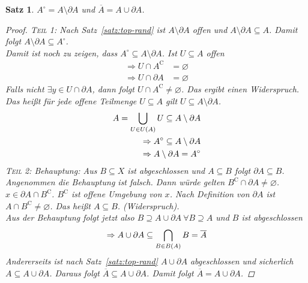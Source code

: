 \documentclass[11pt, twoside, a4paper]{article}
\theoremstyle{plain}
\newtheorem{satz}[blockelement]{Satz}
\numberwithin{equation}{subsection}
\newcommand{\of}[1]{\mathopen{}\mathclose{}\bgroup\left(#1\aftergroup\egroup\right)}
\newcommand{\impl}[0]{\Rightarrow{}}
\newcommand{\exclude}[0]{\setminus}
\renewcommand{\emptyset}{\varnothing}
\begin{document}
    \begin{satz} %
        $A^{\circ} = A \exclude \partial A$ und $\overline{A} = A \cup \partial A$.
        \begin{proof}
            \textsc{Teil 1}: Nach Satz~\ref{satz:top-rand} ist $A\exclude \partial A$ offen und $A \exclude \partial A \subseteq A$. Damit folgt $A \exclude \partial A \subseteq A^{\circ}$.\\
            Damit ist noch zu zeigen, dass $A^{\circ} \subseteq A \exclude \partial A$. Ist $U\subseteq A$ offen
            \begin{align*}
                \impl U\cap A^{\mathrm{C}} &= \emptyset \\
                \impl U \cap \partial A &= \emptyset
            \end{align*}
            Falls nicht $\exists y \in U \cap \partial A$, dann folgt $U\cap A^{\mathrm{C}} \neq \emptyset$. Das ergibt einen Widerspruch.\\
            Das heißt für jede offene Teilmenge $U\subseteq A$ gilt $U\subseteq A\exclude \partial A$.
            \begin{align*}
                A = \bigcup_{U\in U\of{A}} U \subseteq A \exclude \partial A\\
                \impl A^{\circ} \subseteq A \exclude \partial A\\
                \impl A \exclude \partial A = A^{\circ}
            \end{align*}
            \textsc{Teil 2}: Behauptung: Aus $B\subseteq X$ ist abgeschlossen und $A \subseteq B$ folgt $\partial A \subseteq B$. Angenommen die Behauptung ist falsch. Dann würde gelten $B^{\mathrm{C}} \cap \partial A \neq \emptyset$.\\
            $x\in \partial A \cap B^{\mathrm{C}}$. $B^{\mathrm{C}}$ ist offene Umgebung von $x$. Nach Definition von $\partial A$ ist $A\cap B^{\mathrm{C}}\neq \emptyset$. Das heißt $A \subseteq B$. (Widerspruch).\\
            Aus der Behauptung folgt jetzt also $B \supseteq A \cup \partial A~\forall B\supseteq A$ und $B$ ist abgeschlossen
            \begin{align*}
                \impl A \cup \partial A \subseteq \bigcap_{B\in B\of{A}} B = \overline{A}
            \end{align*}
            Andererseits ist nach Satz~\ref{satz:top-rand} $A \cup \partial A$ abgeschlossen und sicherlich $A \subseteq A \cup \partial A$. Daraus folgt $\overline{A} \subseteq A \cup\partial A$. Damit folgt $\overline{A} = A \cup \partial A$.
        \end{proof}
    \end{satz}
\end{document}
